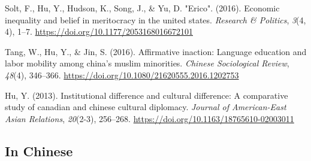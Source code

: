 \documentclass[
  12pt,
]
{article}
\newlength{\cslhangindent}
\newenvironment{CSLReferences}[2] %
 {\begin{list}{}{%
  \setlength{\itemindent}{0pt}
  \setlength{\leftmargin}{0pt}
  \setlength{\parsep}{0pt}
  \ifodd #1
   \setlength{\leftmargin}{\cslhangindent}
   \setlength{\itemindent}{-1\cslhangindent}
  \fi
  \setlength{\itemsep}{#2\baselineskip}}}
 {\end{list}}
\begin{document}
\begin{CSLReferences}{1}{0}
Solt, F., Hu, Y., Hudson, K., Song, J., \& Yu, D. "Erico". (2016).
Economic inequality and belief in meritocracy in the united states.
\emph{Research \& Politics}, \emph{3}(4, 4), 1--7.
\url{https://doi.org/10.1177/2053168016672101}

Tang, W., Hu, Y., \& Jin, S. (2016). Affirmative inaction: Language
education and labor mobility among china's muslim minorities.
\emph{Chinese Sociological Review}, \emph{48}(4), 346--366.
\url{https://doi.org/10.1080/21620555.2016.1202753}

Hu, Y. (2013). Institutional difference and cultural difference: A
comparative study of canadian and chinese cultural diplomacy.
\emph{Journal of American-East Asian Relations}, \emph{20}(2-3),
256--268. \url{https://doi.org/10.1163/18765610-02003011}

\end{CSLReferences}

\subsection{In Chinese}\label{in-chinese}
\end{document}
